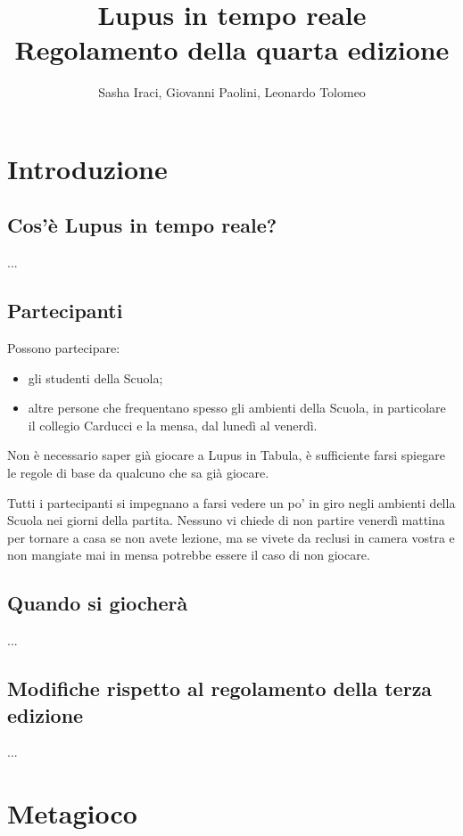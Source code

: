 \documentclass[a4paper,10pt]{article}
\title{Lupus in tempo reale\\ Regolamento della quarta edizione}
\author{Sasha Iraci, Giovanni Paolini, Leonardo Tolomeo}
\begin{document}
\maketitle


\section{Introduzione}

\subsection{Cos'è Lupus in tempo reale?}
...

\subsection{Partecipanti}

Possono partecipare:
\begin{itemize}
 \item gli studenti della Scuola;
 \item altre persone che frequentano spesso gli ambienti della Scuola, in particolare il collegio Carducci e la mensa, dal lunedì al venerdì.
\end{itemize}

Non è necessario saper già giocare a Lupus in Tabula, è sufficiente farsi spiegare le regole di base da qualcuno che sa già giocare.

Tutti i partecipanti si impegnano a farsi vedere un po' in giro negli ambienti della Scuola nei giorni della partita. Nessuno vi chiede di non partire venerdì mattina per tornare a casa se non avete lezione, ma se vivete da reclusi in camera vostra e non mangiate mai in mensa potrebbe essere il caso di non giocare.


\subsection{Quando si giocherà}

...


\subsection{Modifiche rispetto al regolamento della terza edizione}

...


\pagebreak
\section{Metagioco}
\end{document}
